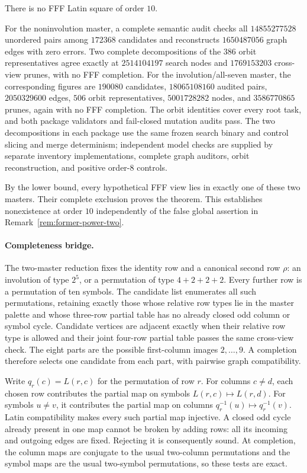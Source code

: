 \begin{computationaltheorem}
\label{cthm:order10-nonexistence}
There is no FFF Latin square of order $10$.
\end{computationaltheorem}

For the noninvolution master, a complete semantic audit checks all
$14855277528$ unordered pairs among $172368$ candidates and reconstructs
$1650487056$ graph edges with zero errors.  Two complete decompositions of
the $386$ orbit representatives agree exactly at $2514104197$ search nodes
and $1769153203$ cross-view prunes, with no FFF completion.  For the
involution/all-seven master, the corresponding figures are $190080$
candidates, $18065108160$ audited pairs, $2050329600$ edges, $506$ orbit
representatives, $5001728282$ nodes, and $3586770865$ prunes, again with no
FFF completion.  The orbit identities cover every root task, and both package
validators and fail-closed mutation audits pass.  The two decompositions in
each package use the same frozen search binary and control slicing and merge
determinism; independent model checks are supplied by separate inventory
implementations, complete graph auditors, orbit reconstruction, and positive
order-$8$ controls.

By the lower bound, every hypothetical FFF view lies in exactly one of these
two masters.  Their complete exclusion proves the theorem.  This establishes
nonexistence at order $10$ independently of the false global assertion in
Remark~\ref{rem:former-power-two}.

\paragraph{Completeness bridge.}
The two-master reduction fixes the identity row and a canonical second row
$\rho$: an involution of type $2^5$, or a permutation of type $4+2+2+2$.
Every further row is a permutation of ten symbols.  The candidate list
enumerates all such permutations, retaining exactly those whose relative
row types lie in the master palette and whose three-row partial table has
no already closed odd column or symbol cycle.  Candidate vertices are
adjacent exactly when their relative row type is allowed and their joint
four-row partial table passes the same cross-view check.  The eight parts
are the possible first-column images $2,\ldots,9$.  A completion therefore
selects one candidate from each part, with pairwise graph compatibility.

Write $q_r(c)=L(r,c)$ for the permutation of row $r$.  For columns $c\ne d$,
each chosen row contributes the partial map on symbols
$L(r,c)\mapsto L(r,d)$.  For symbols $u\ne v$, it contributes the
partial map on columns $q_r^{-1}(u)\mapsto q_r^{-1}(v)$.  Latin compatibility
makes every such partial map injective.  A closed odd cycle already present
in one map cannot be broken by adding rows: all its incoming and outgoing
edges are fixed.  Rejecting it is consequently sound.  At completion, the
column maps are conjugate to the usual two-column permutations and the
symbol maps are the usual two-symbol permutations, so these tests are exact.

